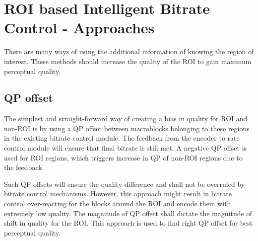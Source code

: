 \documentclass[11pt]{article} %
\begin{document}
\section{ROI based Intelligent Bitrate Control - Approaches}
There are many ways of using the additional information of knowing the region of interest. These methods should increase the quality of the ROI to gain maximum perceptual quality.
\subsection{QP offset}
The simplest and straight-forward way of creating a bias in quality for ROI and non-ROI is by using a QP offset between macroblocks belonging to these regions in the existing bitrate control module. The feedback from the encoder to rate control module will ensure that final bitrate is still met. A negative QP offset  is used for ROI regions, which triggers increase in QP of non-ROI regions due to the feedback. 

Such QP offsets will ensure the quality difference and shall not be overruled by bitrate control mechanisms. However, this approach might result in bitrate control over-reacting for the blocks around the ROI and encode them with extremely low quality. The magnitude of QP offset shall dictate the magnitude of shift in quality for the ROI. This approach is used to find right QP offset for best perceptual quality. 
\end{document}
